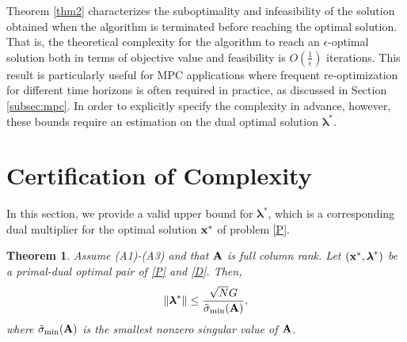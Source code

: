 \documentclass[doublecolumn]{IEEEtran}
\newtheorem{thm}{\bf \noindent Theorem}
\begin{document}
Theorem \ref{thm2} characterizes the suboptimality and infeasibility of the solution obtained when the algorithm is terminated before reaching the optimal solution. That is, the theoretical complexity
for the algorithm to reach an $\epsilon$-optimal solution both in terms of objective value and feasibility
is $O(\frac{1}{\epsilon})$ iterations.
This result is particularly useful for MPC applications where frequent re-optimization for different time horizons is often required in practice, as discussed in Section \ref{subsec:mpc}.
In order to explicitly specify the complexity in advance, however, these bounds require an estimation on the dual optimal solution ${\boldsymbol{\lambda}}^*$.

\section{Certification of Complexity\label{sec:cert}}
In this section, we provide a valid upper bound for ${\boldsymbol{\lambda}}^*$,
which is a corresponding dual multiplier for the optimal solution ${ {\bf x} }^*$ of problem \eqref{P}.

\begin{thm}\label{thm3}
Assume (A1)-(A3) and that ${ {\bf A} }$ is full column rank. Let $({ {\bf x} }^*,{\boldsymbol{\lambda}}^*)$ be a primal-dual optimal pair of \eqref{P} and \eqref{D}.
Then,
\begin{align*}
\|{\boldsymbol{\lambda}}^*\| \le \frac{\sqrt{N}G}{\tilde\sigma_{\min}({ {\bf A} })},
\end{align*}
where $\tilde\sigma_{\min}({ {\bf A} })$ is the smallest nonzero singular value of ${ {\bf A} }$.
\end{thm}
\end{document}
